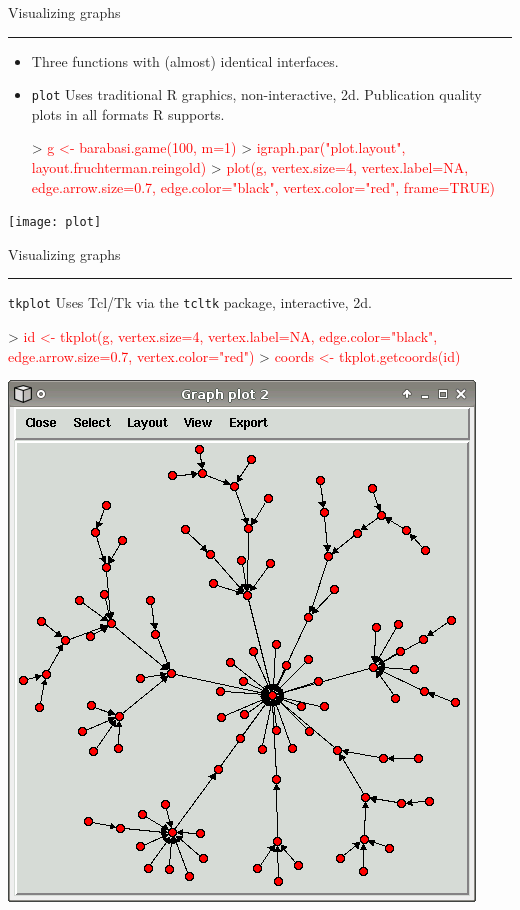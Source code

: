 \documentclass[landscape]{foils}
\newcommand{\stitle}[1]{{\centering\color{blue}\Large #1\par\vspace*{10pt}\hrule}}
\newcommand{\command}[1]{\textcolor{red}{#1}}
\begin{document}
\newpage
\stitle{Visualizing graphs}
\begin{itemize}
\item Three functions with (almost) identical interfaces. \pause
\item \verb+plot+ Uses traditional R graphics, non-interactive, 2d.
  Publication quality plots in all formats R supports.
\begin{Myverb}
> \command{g <- barabasi.game(100, m=1)}
> \command{igraph.par("plot.layout", }
\command{             layout.fruchterman.reingold)}
> \command{plot(g, vertex.size=4, vertex.label=NA, }
\command{       edge.arrow.size=0.7, }
\command{       edge.color="black",}
\command{       vertex.color="red", frame=TRUE)}
\end{Myverb}
\end{itemize}
\begin{flushright}
\vspace*{-8cm}
\texttt{[image: plot]}
\end{flushright}

\newpage
\stitle{Visualizing graphs}
\verb+tkplot+ Uses Tcl/Tk via the \verb+tcltk+ package, 
  interactive, 2d.
\begin{Myverb}
> \command{id <- tkplot(g, vertex.size=4, }
\command{        vertex.label=NA,}
\command{        edge.color="black",}
\command{        edge.arrow.size=0.7,}
\command{        vertex.color="red")}
> \command{coords <- tkplot.getcoords(id)}
\end{Myverb}
\begin{flushright}
\vspace*{-6cm}
\includegraphics{tkplot}
\end{flushright}
\end{document}
